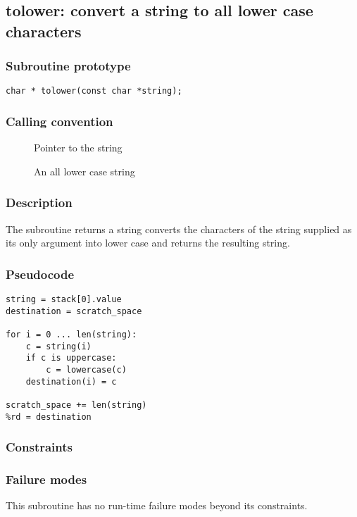 \clearpage
{}
{}
\label{subr:tolower}
\subsection*{tolower: convert a string to all lower case characters}

\subsubsection*{Subroutine prototype}

\begin{verbatim}
char * tolower(const char *string);
\end{verbatim}

\subsubsection*{Calling convention}

\begin{description}
\item[] Pointer to the string
\item[] An all lower case string
\end{description}

\subsubsection*{Description}

The  subroutine returns a string converts the
characters of the string supplied as its only argument into lower case
and returns the resulting string.

\subsubsection*{Pseudocode}

\begin{verbatim}
string = stack[0].value
destination = scratch_space

for i = 0 ... len(string):
    c = string(i)
    if c is uppercase:
        c = lowercase(c)
    destination(i) = c

scratch_space += len(string)
%rd = destination
\end{verbatim}

\subsubsection*{Constraints}

\subsubsection*{Failure modes}

This subroutine has no run-time failure modes beyond its constraints.
